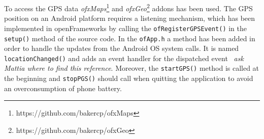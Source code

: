\documentclass[journal]{IEEEtran}
\begin{document}
To access the GPS data \emph{ofxMaps}\footnote{https://github.com/bakercp/ofxMaps} and \emph{ofxGeo}\footnote{https://github.com/bakercp/ofxGeo} addons has been used. The GPS position on an Android platform requires a listening mechanism, which has been implemented in openFrameworks by calling the \texttt{ofRegisterGPSEvent()} in the \texttt{setup()} method of the source code. In the \texttt{ofApp.h} a method has been added in order to handle the updates from the Android OS system calls. It is named \texttt{locationChanged()} and adds an event handler for the dispatched event~\cite{} {\footnotesize{\textit{ask Mattia where to find this reference}}}. Moreover, the \texttt{startGPS()} method is called at the beginning and \texttt{stopPGS()} should call when quitting the application to avoid an overconsumption of phone battery. 


\end{document}
